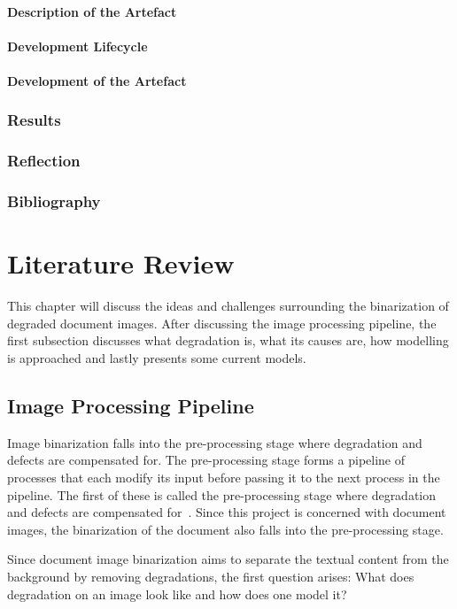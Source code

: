 \documentclass[a4paper, 12pt]{report}
\begin{document}
\subsubsection{Description of the Artefact}
\subsubsection{Development Lifecycle}
\subsubsection{Development of the Artefact}
\subsection{Results}
\subsection{Reflection}
\subsection{Bibliography}

\chapter{Literature Review}
This chapter will discuss the ideas and challenges surrounding the binarization
of degraded document images. After discussing the image processing pipeline,
the first subsection discusses what degradation is, what its causes are, how
modelling is approached and lastly presents some current models.

\section{Image Processing Pipeline}
Image binarization falls into the pre-processing stage where degradation and
defects are compensated for. The pre-processing stage forms a pipeline of
processes that each modify its input before passing it to the next process in
the pipeline. The first of these is called the pre-processing stage where
degradation and defects are compensated for~\cite{ramanath2005color}. Since
this project is concerned with document images, the binarization of the
document also falls into the pre-processing stage.\par

Since document image binarization aims to separate the textual content from the
background by removing degradations, the first question arises: What does
degradation on an image look like and how does one model it?
\end{document}

